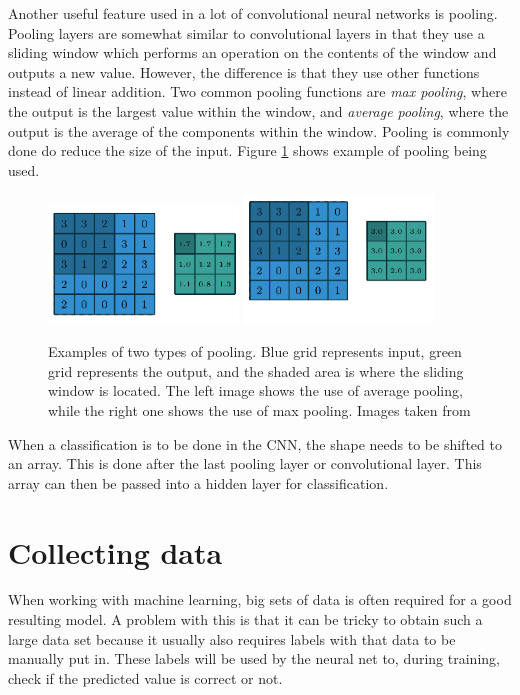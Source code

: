  
 Another useful feature used in a lot of convolutional neural networks is pooling. Pooling layers are somewhat similar to convolutional layers in that they use a sliding window which performs an operation on the contents of the window and outputs a new value. However, the difference is that they use other functions instead of linear addition. Two common pooling functions are \textit{max pooling}, where the output is the largest value within the window, and \textit{average pooling}, where the output is the average of the components within the window.  Pooling is commonly done do reduce the size of the input. Figure \ref{fig:pooling} shows example of pooling being used.
 
 \begin{figure}[hbtp]
\begin{center}
\includegraphics[width = 0.45\textwidth]{./Images/avgPool.png}
\includegraphics[width = 0.45\textwidth]{./Images/maxPool.png}
\caption{Examples of two types of pooling. Blue grid represents input, green grid represents the output, and the shaded area is where the sliding window is located. The left image shows the use of average pooling, while the right one shows the use of max pooling.
Images taken from \cite{convArit}}
\label{fig:pooling}
\end{center}
\end{figure} 
 
When a classification is to be done in the CNN, the shape needs to be shifted to an array. This is done after the last pooling layer or convolutional layer. This array can then be passed into a hidden layer for classification.


\section{Collecting data}
When working with machine learning, big sets of data is often required for a good resulting model.
A problem with this is that it can be tricky to obtain such a large data set because it usually also requires
labels with that data to be manually put in. These labels will be used by the neural net to, during training, check if
the predicted value is correct or not.

